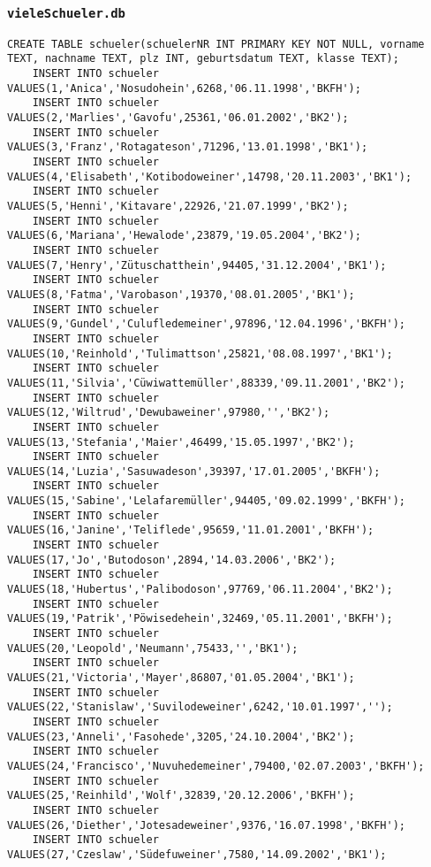 \subsubsection{\lstinline!vieleSchueler.db!}
\begin{lstlisting}[breaklines=True, numbers=none, basicstyle=\tiny, keepspaces=false]
	CREATE TABLE schueler(schuelerNR INT PRIMARY KEY NOT NULL, vorname TEXT, nachname TEXT, plz INT, geburtsdatum TEXT, klasse TEXT);
	INSERT INTO schueler VALUES(1,'Anica','Nosudohein',6268,'06.11.1998','BKFH');
	INSERT INTO schueler VALUES(2,'Marlies','Gavofu',25361,'06.01.2002','BK2');
	INSERT INTO schueler VALUES(3,'Franz','Rotagateson',71296,'13.01.1998','BK1');
	INSERT INTO schueler VALUES(4,'Elisabeth','Kotibodoweiner',14798,'20.11.2003','BK1');
	INSERT INTO schueler VALUES(5,'Henni','Kitavare',22926,'21.07.1999','BK2');
	INSERT INTO schueler VALUES(6,'Mariana','Hewalode',23879,'19.05.2004','BK2');
	INSERT INTO schueler VALUES(7,'Henry','Zütuschatthein',94405,'31.12.2004','BK1');
	INSERT INTO schueler VALUES(8,'Fatma','Varobason',19370,'08.01.2005','BK1');
	INSERT INTO schueler VALUES(9,'Gundel','Culufledemeiner',97896,'12.04.1996','BKFH');
	INSERT INTO schueler VALUES(10,'Reinhold','Tulimattson',25821,'08.08.1997','BK1');
	INSERT INTO schueler VALUES(11,'Silvia','Cüwiwattemüller',88339,'09.11.2001','BK2');
	INSERT INTO schueler VALUES(12,'Wiltrud','Dewubaweiner',97980,'','BK2');
	INSERT INTO schueler VALUES(13,'Stefania','Maier',46499,'15.05.1997','BK2');
	INSERT INTO schueler VALUES(14,'Luzia','Sasuwadeson',39397,'17.01.2005','BKFH');
	INSERT INTO schueler VALUES(15,'Sabine','Lelafaremüller',94405,'09.02.1999','BKFH');
	INSERT INTO schueler VALUES(16,'Janine','Teliflede',95659,'11.01.2001','BKFH');
	INSERT INTO schueler VALUES(17,'Jo','Butodoson',2894,'14.03.2006','BK2');
	INSERT INTO schueler VALUES(18,'Hubertus','Palibodoson',97769,'06.11.2004','BK2');
	INSERT INTO schueler VALUES(19,'Patrik','Pöwisedehein',32469,'05.11.2001','BKFH');
	INSERT INTO schueler VALUES(20,'Leopold','Neumann',75433,'','BK1');
	INSERT INTO schueler VALUES(21,'Victoria','Mayer',86807,'01.05.2004','BK1');
	INSERT INTO schueler VALUES(22,'Stanislaw','Suvilodeweiner',6242,'10.01.1997','');
	INSERT INTO schueler VALUES(23,'Anneli','Fasohede',3205,'24.10.2004','BK2');
	INSERT INTO schueler VALUES(24,'Francisco','Nuvuhedemeiner',79400,'02.07.2003','BKFH');
	INSERT INTO schueler VALUES(25,'Reinhild','Wolf',32839,'20.12.2006','BKFH');
	INSERT INTO schueler VALUES(26,'Diether','Jotesadeweiner',9376,'16.07.1998','BKFH');
	INSERT INTO schueler VALUES(27,'Czeslaw','Südefuweiner',7580,'14.09.2002','BK1');

\end{lstlisting}
